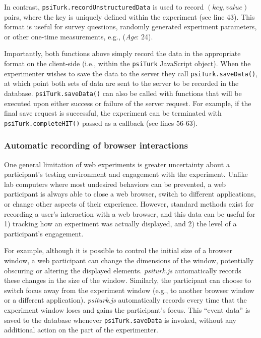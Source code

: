 \documentclass[twocolumn]{svjour3}          %
\newcommand{\psiturkjs}[0]{\emph{psiturk.js}}
\begin{document}
In contrast, \texttt{psiTurk.recordUnstructuredData} is used to record $(key, value)$ pairs, where the key is uniquely defined within the experiment (see line 43).
This format is useful for survey questions, randomly generated experiment parameters, or other one-time measurements, e.g., (\emph{Age}: 24).

Importantly, both functions above simply record the data in the appropriate format on the client-side (i.e., within the \texttt{psiTurk} JavaScript object).
When the experimenter wishes to save the data to the server they call \texttt{psiTurk.saveData()}, at which point both sets of data are sent to the server to be recorded in the database.
\texttt{psiTurk.saveData()} can also be called with functions that will be executed upon either success or failure of the server request.
For example, if the final save request is successful, the experiment can be terminated with \texttt{psiTurk.completeHIT()} passed as a callback (see lines 56-63).  

\subsubsection{Automatic recording of browser interactions}
 
One general limitation of web experiments is greater uncertainty about a participant's testing environment and engagement with the experiment.
Unlike lab computers where most undesired behaviors can be prevented, a web participant is always able to close a web browser, switch to different applications, or change other aspects of their experience.
However, standard methods exist for recording a user's interaction with a web browser, and this data can be useful for 1) tracking how an experiment was actually displayed, and 2) the level of a participant's engagement.

For example, although it is possible to control the initial size of a browser window, a web participant can change the dimensions of the window, potentially obscuring or altering the displayed elements.
\psiturkjs{} automatically records these changes in the size of the window.
Similarly, the participant can choose to switch focus away from the experiment window (e.g., to another browser window or a different application).
\psiturkjs{} automatically records every time that the experiment window loses and gains the participant's focus.
This ``event data'' is saved to the database whenever \texttt{psiTurk.saveData} is invoked, without any additional action on the part of the experimenter. \\
\end{document}
